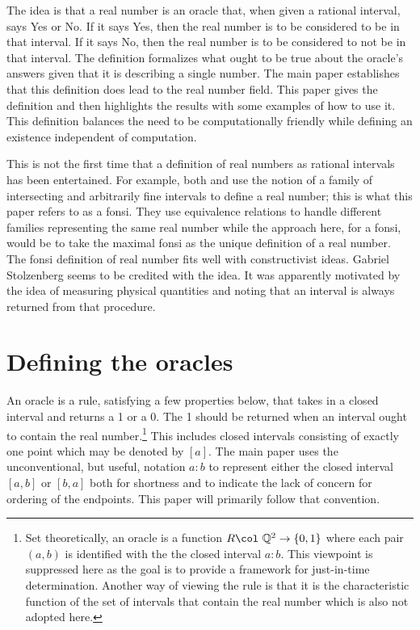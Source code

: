 \documentclass[12pt]{article}
\theoremstyle{remark}
\begin{document}
The idea is that a real number is an oracle that, when given a rational interval, says Yes or No. If it says Yes, then the real number is to be considered to be in that interval. If it says No, then the real number is to be considered to not be in that interval. The definition formalizes what ought to be true about the oracle's answers given that it is describing a single number. The main paper establishes that this definition does lead to the real number field. This paper gives the definition and then highlights the results with some examples of how to use it. This definition balances the need to be computationally friendly while defining an existence independent of computation. 

This is not the first time that a definition of real numbers as rational intervals has been entertained. For example, both \cite{bridger} and \cite{bridges} use the notion of a family of intersecting and arbitrarily fine intervals to define a real number; this is what this paper refers to as a fonsi. They use equivalence relations to handle different families representing the same real number while the approach here, for a fonsi, would be to take the maximal fonsi as the unique definition of a real number. The fonsi definition of real number fits well with constructivist ideas. Gabriel Stolzenberg seems to be credited with the idea. It was apparently motivated by the idea of measuring physical quantities and noting that an interval is always returned from that procedure. 

\section{Defining the oracles}\label{sec:ora}

An oracle is a rule, satisfying a few properties below, that takes in a closed interval and returns a 1 or a 0. The 1 should be returned when an interval ought to contain the real number.\footnote{Set theoretically, an oracle is a function $R \col \ \mathbb{Q}^2 \to \{0,1\}$ where each pair $(a,b)$ is identified with the  the closed interval $a:b$. This viewpoint is suppressed here as the goal is to provide a framework for just-in-time determination. Another way of viewing the rule is that it is the characteristic function of the set of intervals that contain the real number which is also not adopted here.} This includes closed intervals consisting of exactly one point which may be denoted by $[a]$. The main paper uses the unconventional, but useful, notation $a:b$ to represent either the closed interval $[a,b]$ or $[b,a]$ both for shortness and to indicate the lack of concern for ordering of the endpoints. This paper will primarily follow that convention. 
\end{document}

